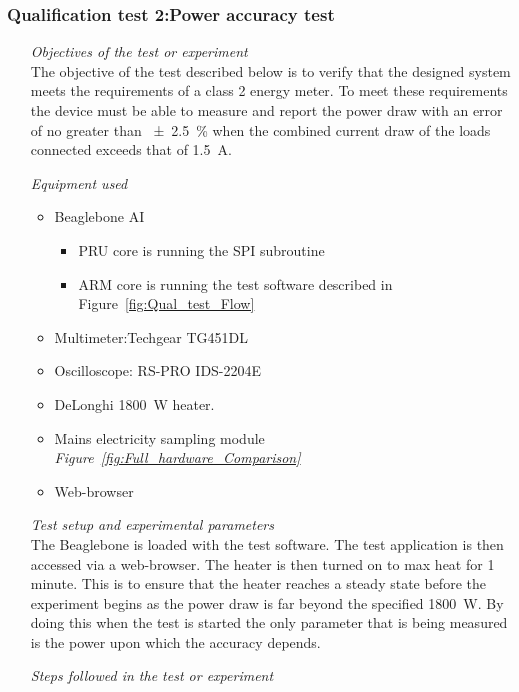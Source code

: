 \subsubsection{Qualification test 2:Power accuracy test}
\label{sec:Power_test}
\begin{itemize}
    \item [\emph{Objectives of the test or experiment}]\mbox{}\\
    The objective of the test described below is to verify that the designed system meets the requirements of a class 2 energy meter. To meet these requirements the device must be able to measure and report the power draw with an error of no greater than \qty{\pm 2.5}{\percent} when the combined current draw of the loads connected exceeds that of \qty{1.5}{\ampere}. 
    \item [\emph{Equipment used}]\mbox{}
    \begin{itemize} 
        \item Beaglebone AI 
        \begin{itemize}
            \item PRU core is running the SPI subroutine 
            \item ARM core is running the test software described in Figure~\ref{fig:Qual_test_Flow}
        \end{itemize}
        \item Multimeter:Techgear TG451DL 
        \item Oscilloscope: RS-PRO IDS-2204E
        \item DeLonghi \qty{1800}{\watt} heater.
        \item Mains electricity sampling module \emph{Figure~\ref{fig:Full_hardware_Comparison}}
        \item Web-browser
    \end{itemize}
    \item [\emph{Test setup and experimental parameters}]\mbox{}\\
    The Beaglebone is loaded with the test software. The test application is then accessed via a web-browser. The heater is then turned on to max heat for 1 minute. This is to ensure that the heater reaches a steady state before the experiment begins as the power draw is far beyond the specified \qty{1800}{\watt}. By doing this when the test is started the only parameter that is being measured is the power upon which the accuracy depends.
    \item [\emph{Steps followed in the test or experiment}]\mbox{}

\end{itemize}
